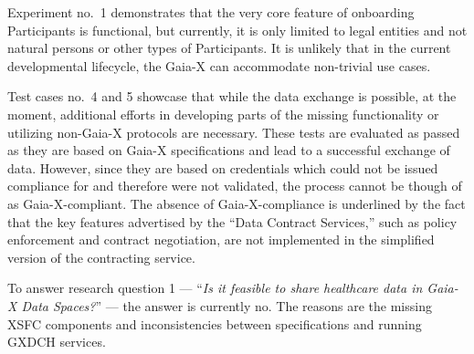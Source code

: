 Experiment no.~1 demonstrates that the very core feature of onboarding Participants is functional, but currently, it is only limited to legal entities and not natural persons or other types of Participants.
It is unlikely that in the current developmental lifecycle, the Gaia-X can accommodate non-trivial use cases.

Test cases no.~4 and 5 showcase that while the data exchange is possible, at the moment, additional efforts in developing parts of the missing functionality or utilizing non-Gaia-X protocols are necessary.
These tests are evaluated as passed as they are based on Gaia-X specifications and lead to a successful exchange of data.
However, since they are based on credentials which could not be issued compliance for and therefore were not validated, the process cannot be though of as Gaia-X-compliant.
The absence of Gaia-X-compliance is underlined by the fact that the key features advertised by the ``Data Contract Services,'' such as policy enforcement and contract negotiation, are not implemented in the simplified version of the contracting service.

To answer research question 1 --- ``\textit{Is it feasible to share healthcare data in Gaia-X Data Spaces?}'' --- the answer is currently no.
The reasons are the missing XSFC components and inconsistencies between specifications and running GXDCH services.
